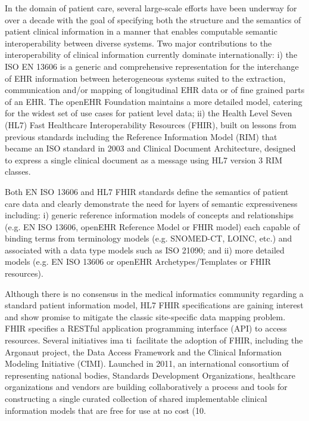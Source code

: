 \documentclass{amia}
\newcommand{\remPierre}[1]{\todo[color=green]{[PZ]{\scriptsize #1\par}}}
\begin{document}
In the domain of patient care, several large-scale efforts have been underway for over a decade with the goal of specifying both the structure and the semantics of patient clinical information in a manner that enables computable semantic interoperability between diverse systems. Two major contributions to the interoperability of clinical information currently dominate internationally: i) the ISO EN 13606 is a generic and comprehensive representation for the interchange of EHR information between heterogeneous systems suited to the extraction, communication and/or mapping of longitudinal EHR data or of fine grained parts of an EHR. The openEHR Foundation maintains a more detailed model, catering for the widest set of use cases for patient level data; ii) the Health Level Seven (HL7) Fast Healthcare Interoperability Resources (FHIR), built on lessons\cite{ref10} from previous standards including the Reference Information Model (RIM) that became an ISO standard in 2003 and Clinical Document Architecture, designed to express a single clinical document as a message using HL7 version 3 RIM classes.

Both EN ISO 13606 and HL7 FHIR standards define the semantics of patient care data and clearly demonstrate the need for layers of semantic expressiveness including: i) generic reference information models of concepts and relationships (e.g. EN ISO 13606, openEHR Reference Model or FHIR model) each capable of binding terms from terminology models (e.g. SNOMED-CT, LOINC, etc.) and associated with a data type models such as ISO 21090; and ii) more detailed models (e.g. EN ISO 13606 or openEHR Archetypes/Templates or FHIR resources). 

Although there is no consensus in the medical informatics community regarding a standard patient information model, HL7 FHIR specifications are gaining interest and show promise to mitigate the classic site-specific data mapping problem. FHIR specifies a RESTful application programming interface (API) to access resources. Several initiatives ima ti\remPierre{ima ti?}\ facilitate the adoption of FHIR, including the Argonaut project\cite{ref11}, the Data Access Framework\cite{ref12} and the Clinical Information Modeling Initiative (CIMI). Launched in 2011, an international consortium of representing national bodies, Standards Development Organizations, healthcare organizations and vendors are building collaboratively a process and tools for constructing a single curated collection of shared implementable clinical information models that are free for use at no cost (10.
\end{document}
